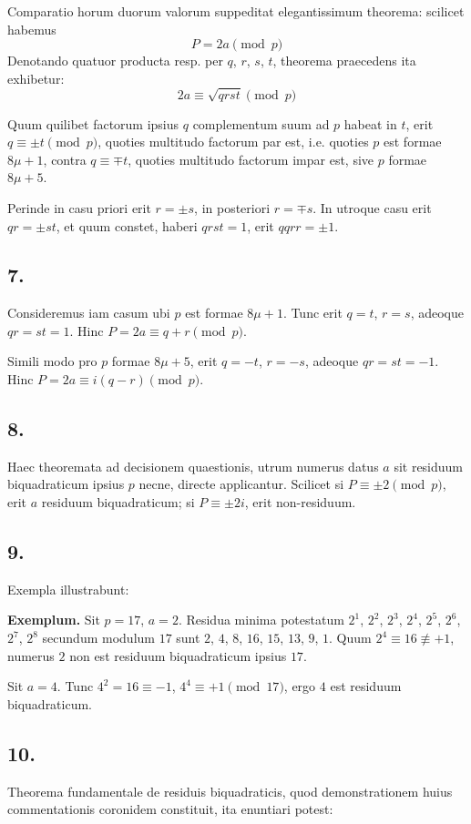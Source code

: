 \documentclass[12pt,a4paper]{article}
\theoremstyle{plain}
\theoremstyle{definition}
\theoremstyle{remark}
\begin{document}
Comparatio horum duorum valorum suppeditat elegantissimum theorema: scilicet habemus
\[P = 2a \pmod{p}\]
Denotando quatuor producta resp. per $q$, $r$, $s$, $t$, theorema praecedens ita exhibetur:
\[2a \equiv \sqrt{qrst} \pmod{p}\]

Quum quilibet factorum ipsius $q$ complementum suum ad $p$ habeat in $t$, erit $q \equiv \pm t \pmod{p}$, quoties multitudo factorum par est, i.e. quoties $p$ est formae $8\mu+1$, contra $q \equiv \mp t$, quoties multitudo factorum impar est, sive $p$ formae $8\mu+5$.

Perinde in casu priori erit $r = \pm s$, in posteriori $r = \mp s$. In utroque casu erit $qr = \pm st$, et quum constet, haberi $qrst = 1$, erit $qqrr = \pm 1$.

\newpage
\subsection*{7.}
Consideremus iam casum ubi $p$ est formae $8\mu+1$. Tunc erit $q = t$, $r = s$, adeoque $qr = st = 1$. Hinc $P = 2a \equiv q+r \pmod{p}$.

Simili modo pro $p$ formae $8\mu+5$, erit $q = -t$, $r = -s$, adeoque $qr = st = -1$. Hinc $P = 2a \equiv i(q-r) \pmod{p}$.

\subsection*{8.}
Haec theoremata ad decisionem quaestionis, utrum numerus datus $a$ sit residuum biquadraticum ipsius $p$ necne, directe applicantur. Scilicet si $P \equiv \pm 2 \pmod{p}$, erit $a$ residuum biquadraticum; si $P \equiv \pm 2i$, erit non-residuum.

\subsection*{9.}
Exempla illustrabunt:

\textbf{Exemplum.} Sit $p=17$, $a=2$. Residua minima potestatum $2^1$, $2^2$, $2^3$, $2^4$, $2^5$, $2^6$, $2^7$, $2^8$ secundum modulum $17$ sunt $2$, $4$, $8$, $16$, $15$, $13$, $9$, $1$. Quum $2^4 \equiv 16 \not\equiv +1$, numerus $2$ non est residuum biquadraticum ipsius $17$.

Sit $a=4$. Tunc $4^2 = 16 \equiv -1$, $4^4 \equiv +1 \pmod{17}$, ergo $4$ est residuum biquadraticum.

\subsection*{10.}
Theorema fundamentale de residuis biquadraticis, quod demonstrationem huius commentationis coronidem constituit, ita enuntiari potest:
\end{document}
